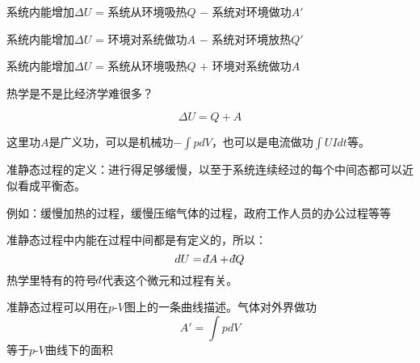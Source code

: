 \documentclass[CJK]{beamer}
\begin{document}
\begin{frame}
\bch
\tbox
{\small 系统内能增加$\Delta U$ = 系统从环境吸热$Q$ $-$  系统对环境做功$A'$}

\ech
\end{frame}


\begin{frame}
\bch
\tbox
{\small 系统内能增加$\Delta U$ = 环境对系统做功$A$ $-$ 系统对环境放热$Q'$}

\ech
\end{frame}

\begin{frame}
\bch
\tbox
{\small 系统内能增加$\Delta U$ = 系统从环境吸热$Q$ $+$ 环境对系统做功$A$}
\ech
\end{frame}

\begin{frame}
\bch

\huaixiao 热学是不是比经济学难很多？
\ech
\end{frame}


\begin{frame}
\bch
$$ \Delta U =  Q + A $$

\skiplines

这里功$A$是{\blue 广义功}，可以是机械功$-\int pdV$，也可以是电流做功$\int UIdt$等。
\ech
\end{frame}

\begin{frame}
\bch
准静态过程的定义：{\blue 进行得足够缓慢，以至于系统连续经过的每个中间态都可以近似看成平衡态。}

\skiplines

{\small 例如：缓慢加热的过程，缓慢压缩气体的过程，政府工作人员的办公过程等等}


\ech
\end{frame}


\begin{frame}
\bch
准静态过程中内能在过程中间都是有定义的，所以：
{\blue
$$dU = \dbar A + \dbar Q$$
}
热学里特有的符号$\dbar$代表这个微元和过程有关。

\ech
\end{frame}


\begin{frame}
\bch
准静态过程可以用在$p$-$V$图上的一条曲线描述。气体对外界做功
$$ A' = \int p dV $$
等于$p$-$V$曲线下的面积

\ech
\end{frame}
\end{document}
